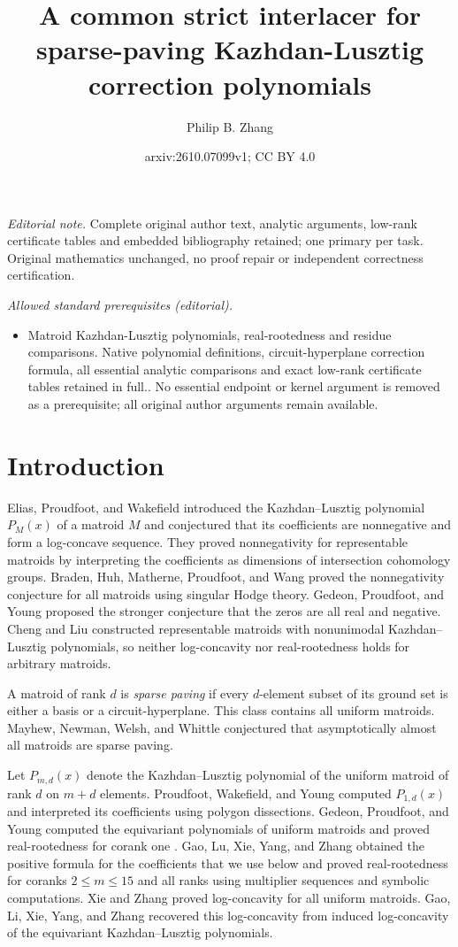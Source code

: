 \documentclass[10pt,a4paper]{article}
\title{A common strict interlacer for sparse-paving Kazhdan-Lusztig correction polynomials}
\author{Philip B. Zhang}
\date{arxiv:2610.07099v1; CC BY 4.0}
\numberwithin{equation}{section}
\theoremstyle{remark}\newtheorem{remark}[theorem]{Remark}
\begin{document}
\maketitle
\noindent\textit{Editorial note.} Complete original author text, analytic arguments, low-rank certificate tables and embedded bibliography retained; one primary per task. Original mathematics unchanged, no proof repair or independent correctness certification.\par\medskip
\noindent\textit{Allowed standard prerequisites (editorial).}\begin{itemize}
\item Matroid Kazhdan-Lusztig polynomials, real-rootedness and residue comparisons. Native polynomial definitions, circuit-hyperplane correction formula, all essential analytic comparisons and exact low-rank certificate tables retained in full.. No essential endpoint or kernel argument is removed as a prerequisite; all original author arguments remain available.
\end{itemize}\medskip
\section{Introduction}

Elias, Proudfoot, and Wakefield \cite{EPW} introduced the
Kazhdan--Lusztig polynomial $P_M(x)$ of a matroid $M$ and conjectured
that its coefficients are nonnegative and form a log-concave sequence.
They proved nonnegativity for representable matroids by interpreting the coefficients
as dimensions of intersection cohomology groups. Braden, Huh, Matherne, Proudfoot,
and Wang \cite{BHMPW} proved the nonnegativity conjecture for all matroids
using singular Hodge theory. Gedeon, Proudfoot, and Young
\cite{GPY} proposed the stronger conjecture that the
zeros are all real and negative. Cheng and Liu \cite{CL} constructed
representable matroids with nonunimodal Kazhdan--Lusztig polynomials,
so neither log-concavity nor real-rootedness holds for arbitrary
matroids.

A matroid of rank $d$ is \emph{sparse paving} if every $d$-element
subset of its ground set is either a basis or a circuit-hyperplane.
This class contains all uniform matroids. Mayhew, Newman, Welsh, and
Whittle \cite{MNWW} conjectured that asymptotically almost all matroids
are sparse paving.

Let $P_{m,d}(x)$ denote the
Kazhdan--Lusztig polynomial of the uniform matroid of rank $d$ on
$m+d$ elements. Proudfoot, Wakefield, and Young
\cite{PWY} computed $P_{1,d}(x)$ and interpreted its coefficients
using polygon dissections. Gedeon, Proudfoot, and Young
computed the equivariant polynomials of uniform matroids \cite{GPYeq}
and proved real-rootedness for corank one \cite[Theorem~3.3]{GPY}.
Gao, Lu, Xie, Yang, and
Zhang \cite{GLXYZ} obtained the positive formula for the coefficients that we use
below and proved real-rootedness for coranks $2\le m\le15$ and all
ranks using multiplier sequences and symbolic computations. Xie and Zhang \cite{XZ} proved
log-concavity for all uniform matroids. Gao, Li, Xie, Yang, and Zhang
\cite{GLiXYZ} recovered this log-concavity from induced log-concavity of
the equivariant Kazhdan--Lusztig polynomials.
\end{document}
